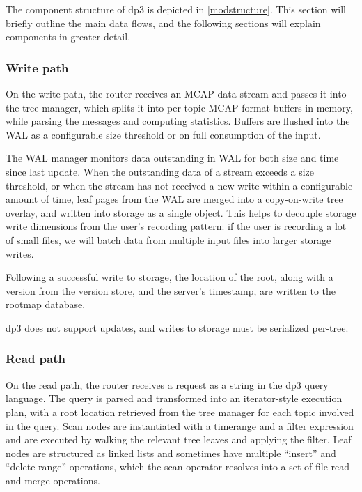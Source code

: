 \documentclass[9pt,twocolumn]{article}
\newcommand{\q}[1]{``#1''}
\begin{document}
    The component structure of dp3 is depicted in \autoref{modstructure}. This
    section will briefly outline the main data flows, and the following sections
    will explain components in greater detail.

    \subsubsection{Write path}
    On the write path, the router receives an MCAP data stream and passes it
    into the tree manager, which splits it into per-topic MCAP-format buffers
    in memory, while parsing the messages and computing statistics. Buffers are
    flushed into the WAL as a configurable size threshold or on full
    consumption of the input.

    The WAL manager monitors data outstanding in WAL for both size and time
    since last update. When the outstanding data of a stream exceeds a size
    threshold, or when the stream has not received a new write within a
    configurable amount of time, leaf pages from the WAL are merged into a
    copy-on-write tree overlay, and written into storage as a single object.
    This helps to decouple storage write dimensions from the user’s recording
    pattern: if the user is recording a lot of small files, we will batch data
    from multiple input files into larger storage writes.

    Following a successful write to storage, the location of the root, along with a
    version from the version store, and the server’s timestamp, are written to the
    rootmap database.

    dp3 does not support updates, and writes to storage must be serialized
    per-tree.

    \subsubsection{Read path}
    On the read path, the router receives a request as a string in the dp3
    query language. The query is parsed and transformed into an iterator-style
    execution plan, with a root location retrieved from the tree manager for
    each topic involved in the query. Scan nodes are instantiated with a
    timerange and a filter expression and are executed by walking the relevant
    tree leaves and applying the filter. Leaf nodes are structured as linked
    lists and sometimes have multiple \q{insert} and \q{delete range}
    operations, which the scan operator resolves into a set of file read and
    merge operations.
\end{document}
